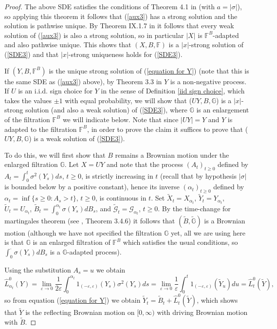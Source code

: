 \documentclass[reqno]{amsart}
\theoremstyle{definition}
\theoremstyle{remark}
\numberwithin{equation}{section}
\begin{document}
\begin{proof}
The above SDE satisfies the conditions of Theorem 4.1 in \cite{Bass-Chen}
(with $a=\left\vert \sigma \right\vert $), so applying this theorem it
follows that (\ref{aux3}) has a strong solution and the solution is pathwise unique. By Theorem IX.1.7 in \cite{Revuz and Yor} it follows that every weak solution of (\ref{aux3}) is also a strong solution, so  in particular $\vert X\vert$ is $\mathbb{F}^B$-adapted and also pathwise unique. This shows that $(X,B,\mathbb{F})$ is a $\vert x\vert$-strong solution of (\ref{SDE3}) and that $\vert x\vert$-strong uniqueness holds for (\ref{SDE3}).

If $(Y,B,\mathbb{F}^B)$ is the unique strong solution of (\ref{equation for Y}) (note that this is the same SDE as (\ref{aux3}) above), by Theorem 3.3 in \cite{Bass-Chen} $Y$ is a non-negative process. If $U$ is an i.i.d. sign choice for $Y$ in the sense of Definition \ref{iid sign choice}, which takes the values $\pm 1$ with equal probability, we will show that ($UY,B,\mathbb{G}$) is a $\vert x\vert$-strong solution (and also a weak solution) of (\ref{SDE3}), where $\mathbb{G}$ is an enlargement of the filtration $\mathbb{F}^B$ we will indicate below. Note that since $\vert U Y\vert = Y$ and $Y$ is adapted to the filtration $\mathbb{F}^B$, in order to prove the claim it suffices to prove that ($UY,B,\mathbb{G}$) is a weak solution of (\ref{SDE3}).

To do this, we will first show that $B$ remains a Brownian motion under the enlarged filtration $\mathbb{G}$. Let $X=UY$ and note that the process $(A_t)_{t\ge0}$ defined by $A_t=\int_0^t\sigma^2(Y_s)ds$, $t\ge0$, is strictly increasing in $t$ (recall that by hypothesis $\vert \sigma\vert $ is bounded below by a positive constant), hence its inverse $(\alpha_t)_{t\ge0}$ defined by $\alpha_t=\inf\{s\ge0:A_s>t\}$, $t\ge 0$, is continuous in $t$. Set $\widetilde{X}_t=X_{\alpha_t}$, $\widetilde{Y}_t=Y_{\alpha_t}$, $\widetilde{U}_t=U_{\alpha_t}$, $\widetilde{B}_t=\int_0^{\alpha_t}\sigma(Y_s)dB_s$, and $\widetilde{\mathcal{G}}_t=\mathcal{G}_{\alpha_t}$, $t \ge 0$. By the time-change for martingales theorem (see \cite{Karatzas-Shreve}, Theorem 3.4.6) it follows that $(\widetilde{B}, \widetilde{\mathbb{G}})$ is a Brownian motion (although we have not specified the filtration $\mathbb{G}$ yet, all we are using here is that $\mathbb{G}$ is an enlarged filtration of $\mathbb{F}^B$ which satisfies the usual conditions, so $\int_0^{\cdot}\sigma(Y_s)dB_s$ is a $\mathbb{G}$-adapted process).

Using the substitution $A_s=u$ we obtain $$\widehat{L}^0_{\alpha_t}(Y)=\lim_{\varepsilon\rightarrow 0} \frac{1}{2\varepsilon}\int_0^{\alpha_t} 1_{(-\varepsilon,\varepsilon)}(Y_{s}) \sigma^2(Y_s) ds= \lim_{\varepsilon\rightarrow 0} \frac{1}{\varepsilon} \int_0^{t} 1_{(-\varepsilon,\varepsilon)}(\widetilde{Y}_u)du=\widehat{L}_t^0(\widetilde{Y}),$$ so from equation (\ref{equation for Y}) we obtain $\widetilde{Y}_t=\widetilde{B}_t+\widehat{L}_t^0(\widetilde{Y})$, which shows that $\widetilde{Y}$ is the reflecting Brownian motion on $[0,\infty)$ with driving Brownian motion with $\widetilde{B}$.


\end{proof}
\end{document}
